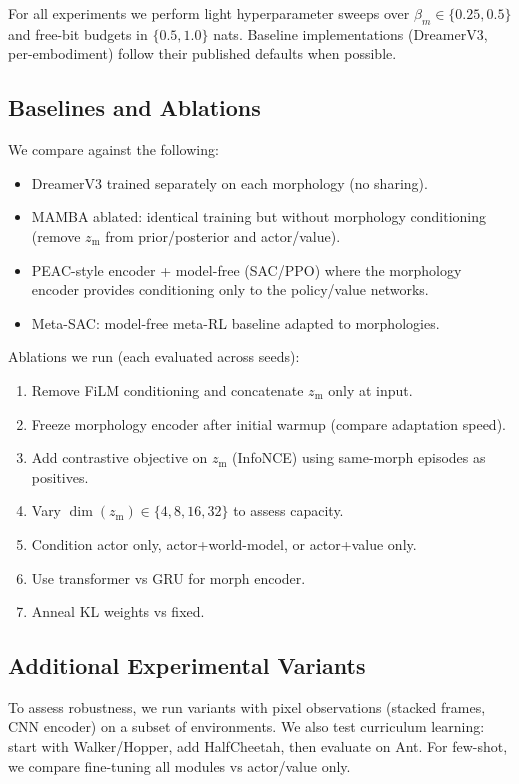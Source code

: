 \documentclass{article}
\begin{document}
For all experiments we perform light hyperparameter sweeps over $\beta_m\in\{0.25, 0.5\}$ and free-bit budgets in $\{0.5, 1.0\}$ nats. Baseline implementations (DreamerV3, per-embodiment) follow their published defaults when possible.

\subsection{Baselines and Ablations}
We compare against the following:
\begin{itemize}
  \item DreamerV3 trained separately on each morphology (no sharing).
  \item MAMBA ablated: identical training but without morphology conditioning (remove $z_{\mathrm{m}}$ from prior/posterior and actor/value).
  \item PEAC-style encoder + model-free (SAC/PPO) where the morphology encoder provides conditioning only to the policy/value networks.
  \item Meta-SAC: model-free meta-RL baseline adapted to morphologies.
\end{itemize}

Ablations we run (each evaluated across seeds):
\begin{enumerate}
  \item Remove FiLM conditioning and concatenate $z_{\mathrm{m}}$ only at input.
  \item Freeze morphology encoder after initial warmup (compare adaptation speed).
  \item Add contrastive objective on $z_{\mathrm{m}}$ (InfoNCE) using same-morph episodes as positives.
  \item Vary $\dim(z_{\mathrm{m}})\in\{4,8,16,32\}$ to assess capacity.
  \item Condition actor only, actor+world-model, or actor+value only.
  \item Use transformer vs GRU for morph encoder.
  \item Anneal KL weights vs fixed.
\end{enumerate}

\subsection{Additional Experimental Variants}
To assess robustness, we run variants with pixel observations (stacked frames, CNN encoder) on a subset of environments. We also test curriculum learning: start with Walker/Hopper, add HalfCheetah, then evaluate on Ant. For few-shot, we compare fine-tuning all modules vs actor/value only.
\end{document}
